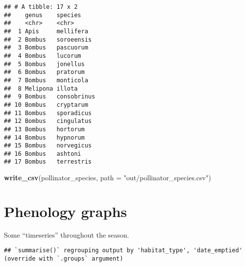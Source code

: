 \documentclass[]{article}
\newenvironment{Shaded}{\begin{snugshade}}{\end{snugshade}}
\newcommand{\DataTypeTok}[1]{\textcolor[rgb]{0.13,0.29,0.53}{#1}}
\newcommand{\DecValTok}[1]{\textcolor[rgb]{0.00,0.00,0.81}{#1}}
\newcommand{\KeywordTok}[1]{\textcolor[rgb]{0.13,0.29,0.53}{\textbf{#1}}}
\newcommand{\NormalTok}[1]{#1}
\newcommand{\OperatorTok}[1]{\textcolor[rgb]{0.81,0.36,0.00}{\textbf{#1}}}
\newcommand{\StringTok}[1]{\textcolor[rgb]{0.31,0.60,0.02}{#1}}
\begin{document}
\begin{verbatim}
## # A tibble: 17 x 2
##    genus    species    
##    <chr>    <chr>      
##  1 Apis     mellifera  
##  2 Bombus   soroeensis 
##  3 Bombus   pascuorum  
##  4 Bombus   lucorum    
##  5 Bombus   jonellus   
##  6 Bombus   pratorum   
##  7 Bombus   monticola  
##  8 Melipona illota     
##  9 Bombus   consobrinus
## 10 Bombus   cryptarum  
## 11 Bombus   sporadicus 
## 12 Bombus   cingulatus 
## 13 Bombus   hortorum   
## 14 Bombus   hypnorum   
## 15 Bombus   norvegicus 
## 16 Bombus   ashtoni    
## 17 Bombus   terrestris
\end{verbatim}

\begin{Shaded}
\begin{Highlighting}[]
\KeywordTok{write_csv}\NormalTok{(pollinator_species, }
          \DataTypeTok{path =} \StringTok{"out/pollinator_species.csv"}\NormalTok{)}
\end{Highlighting}
\end{Shaded}

\hypertarget{phenology-graphs}{%
\section{Phenology graphs}\label{phenology-graphs}}

Some ``timeseries'' throughout the season.

\begin{Shaded}
\end{Shaded}

\begin{verbatim}
## `summarise()` regrouping output by 'habitat_type', 'date_emptied' (override with `.groups` argument)
\end{verbatim}
\end{document}
